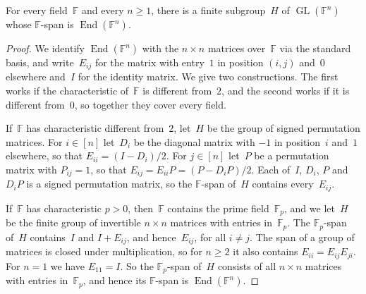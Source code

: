 \documentclass[11pt,letterpaper]{article}
\newcommand{\FF}{\mathbb{F}}
\DeclareMathOperator{\GL}{GL}
\DeclareMathOperator{\End}{End}
\begin{document}
\begin{lemma}\label{lem:spanning-group}
For every field~$\FF$ and every $n \geq 1$, there is a finite subgroup~$H$ of $\GL(\FF^n)$ whose $\FF$-span is $\End(\FF^n)$.
\end{lemma}
\begin{proof}
We identify $\End(\FF^n)$ with the $n \times n$ matrices over~$\FF$ via the standard basis, and write~$E_{ij}$ for the matrix with entry~$1$ in position $(i,j)$ and~$0$ elsewhere and~$I$ for the identity matrix. We give two constructions. The first works if the characteristic of~$\FF$ is different from~$2$, and the second works if it is different from~$0$, so together they cover every field.

If~$\FF$ has characteristic different from~$2$, let~$H$ be the group of signed permutation matrices. For $i \in [n]$ let~$D_i$ be the diagonal matrix with $-1$ in position~$i$ and~$1$ elsewhere, so that $E_{ii} = (I - D_i)/2$. For $j \in [n]$ let~$P$ be a permutation matrix with $P_{ij} = 1$, so that $E_{ij} = E_{ii} P = (P - D_i P)/2$. Each of~$I$, $D_i$, $P$ and $D_i P$ is a signed permutation matrix, so the $\FF$-span of~$H$ contains every~$E_{ij}$.

If~$\FF$ has characteristic $p > 0$, then~$\FF$ contains the prime field~$\FF_p$, and we let~$H$ be the finite group of invertible $n \times n$ matrices with entries in~$\FF_p$. The $\FF_p$-span of~$H$ contains~$I$ and $I + E_{ij}$, and hence~$E_{ij}$, for all $i \neq j$. The span of a group of matrices is closed under multiplication, so for $n \geq 2$ it also contains $E_{ii} = E_{ij} E_{ji}$. For $n = 1$ we have $E_{11} = I$. So the $\FF_p$-span of~$H$ consists of all $n \times n$ matrices with entries in~$\FF_p$, and hence its $\FF$-span is $\End(\FF^n)$.
\end{proof}
\end{document}
